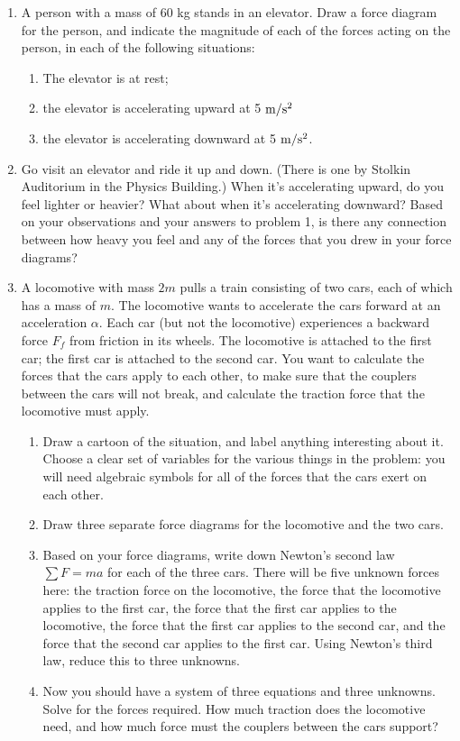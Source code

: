 \documentclass[12pt]{article}
\begin{document}
\Large
\centerline{}
\normalsize
\centerline{}

\begin{enumerate}

 	\item{A person with a mass of 60 kg stands in an elevator. Draw a force diagram for the
 	person, and indicate the magnitude of each of the forces acting on the person, in each
 	of the following situations:}
\begin{enumerate}
 	\item{The elevator is at rest;}
 	\item{the elevator is accelerating upward at 5 $\rm m/\rm s^2$} 
 	\item{the elevator is accelerating downward at 5 $\rm m/\rm s^2$.}
\end{enumerate}

 	\item{Go visit an elevator and ride it up and down. (There is one by Stolkin Auditorium in the Physics Building.) When it’s accelerating upward, do you
 	feel lighter or heavier? What about when it’s accelerating downward? Based on your
 	observations and your answers to problem 1, is there any connection between how
 	heavy you feel and any of the forces that you drew in your force diagrams?}
 	

\item A locomotive with mass $2m$ pulls a train consisting of two cars, each of which has a mass of $m$. The locomotive wants to accelerate the cars forward at an acceleration $\alpha$. Each car (but not the locomotive) experiences a backward force 
$F_f$ from friction in its wheels. The locomotive is attached to the first car; the first car is attached to the second car. You want to calculate the forces that the cars apply to each other, to make sure that the couplers 
between the cars will not break, and calculate the traction force that the locomotive must apply.

\begin{enumerate}
\item Draw a cartoon of the situation, and label anything interesting about it. Choose a clear set of variables for the various things in the problem: you will need algebraic symbols for all of the forces that the cars exert on each other.
\item Draw three separate force diagrams for the locomotive and the two cars.
\item Based on your force diagrams, write down Newton's second law $\sum F = ma$ for each of the three cars. There will be five unknown forces here: the traction force on the locomotive, the force that the locomotive applies to the first car,
the force that the first car applies to the locomotive, the force that the first car applies to the second car, and the force that the second car applies to the first car. Using Newton's third law, reduce this to three unknowns.
\item Now you should have a system of three equations and three unknowns. Solve for the forces required. How much 
traction does the locomotive need, and how much force must the couplers between the cars support?
\end{enumerate} 


\end{enumerate}
\end{document}
